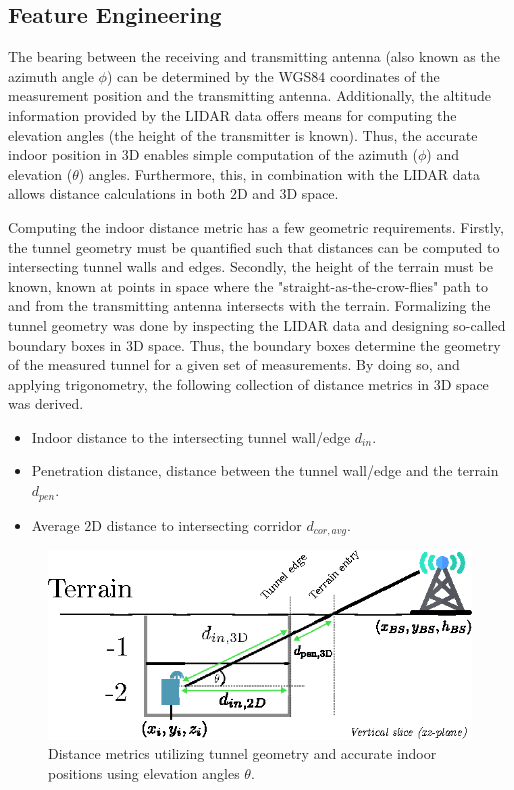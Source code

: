 \subsection{Feature Engineering}
The bearing between the receiving and transmitting antenna (also known as the azimuth angle $\phi$) can be determined by the WGS$84$ coordinates of the measurement position and the transmitting antenna. Additionally, the altitude information provided by the LIDAR data offers means for computing the elevation angles (the height of the transmitter is known). Thus, the accurate indoor position in $3$D enables simple computation of the azimuth ($\phi$) and elevation ($\theta$) angles. Furthermore, this, in combination with the LIDAR data allows distance calculations in both $2$D and $3$D space. 

Computing the indoor distance metric has a few geometric requirements. Firstly, the tunnel geometry must be quantified such that distances can be computed to intersecting tunnel walls and edges. Secondly, the height of the terrain must be known, known at points in space where the "straight-as-the-crow-flies" path to and from the transmitting antenna intersects with the terrain. Formalizing the tunnel geometry was done by inspecting the LIDAR data and designing so-called boundary boxes in $3$D space. Thus, the boundary boxes determine the geometry of the measured tunnel for a given set of measurements. By doing so, and applying trigonometry, the following collection of distance metrics in $3$D space was derived.

\begin{itemize}
    \item Indoor distance to the intersecting tunnel wall/edge $d_{in}$.
    \item Penetration distance, distance between the tunnel wall/edge and the terrain $d_{pen}$.
    \item Average $2$D distance to intersecting corridor $d_{cor,avg}$.
\end{itemize}


\begin{figure}
    \centering
    \includegraphics{chapters/part_pathloss/figures/outdoor_to_indoor/inside_distance_illustration.eps}
    \caption{Distance metrics utilizing tunnel geometry and accurate indoor positions using elevation angles $\theta$.}
    \label{fig:inside_distance_xz}
\end{figure}

